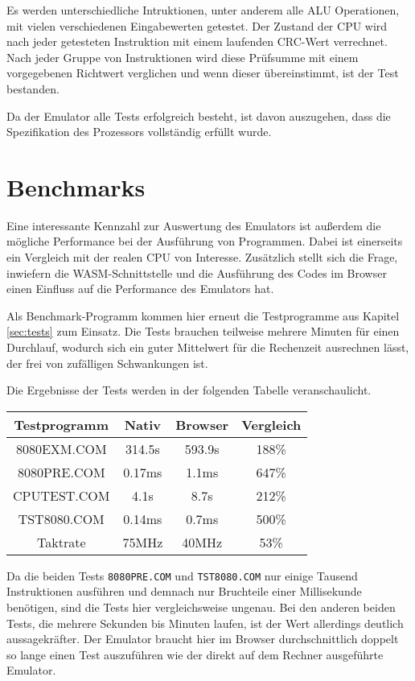 Es werden unterschiedliche Intruktionen, unter anderem alle \ac{ALU} Operationen, mit vielen verschiedenen Eingabewerten getestet. Der Zustand der \ac{CPU} wird nach jeder getesteten Instruktion mit einem laufenden \ac{CRC}-Wert verrechnet. Nach jeder Gruppe von Instruktionen wird diese Prüfsumme mit einem vorgegebenen Richtwert verglichen und wenn dieser übereinstimmt, ist der Test bestanden.

Da der Emulator alle Tests erfolgreich besteht, ist davon auszugehen, dass die Spezifikation des Prozessors vollständig erfüllt wurde.

\section{Benchmarks}

Eine interessante Kennzahl zur Auswertung des Emulators ist außerdem die mögliche Performance bei der Ausführung von Programmen. Dabei ist einerseits ein Vergleich mit der realen \ac{CPU} von Interesse. Zusätzlich stellt sich die Frage, inwiefern die \ac{WASM}-Schnittstelle und die Ausführung des Codes im Browser einen Einfluss auf die Performance des Emulators hat.

Als Benchmark-Programm kommen hier erneut die Testprogramme aus Kapitel \ref{sec:tests} zum Einsatz. Die Tests brauchen teilweise mehrere Minuten für einen Durchlauf, wodurch sich ein guter Mittelwert für die Rechenzeit ausrechnen lässt, der frei von zufälligen Schwankungen ist.

Die Ergebnisse der Tests werden in der folgenden Tabelle veranschaulicht.

\begin{center}
\begin{tabular}{ |c|c|c|c| } 
    \hline
    Testprogramm & Nativ & Browser & Vergleich \\
    \hline
    8080EXM.COM & 314.5s & 593.9s & 188\% \\
    8080PRE.COM & 0.17ms & 1.1ms & 647\% \\
    CPUTEST.COM & 4.1s & 8.7s & 212\% \\
    TST8080.COM & 0.14ms & 0.7ms & 500\% \\
    \hline
    Taktrate & 75MHz & 40MHz & 53\% \\
    \hline
\end{tabular}
\end{center}

Da die beiden Tests \texttt{8080PRE.COM} und \texttt{TST8080.COM} nur einige Tausend Instruktionen ausführen und demnach nur Bruchteile einer Millisekunde benötigen, sind die Tests hier vergleichsweise ungenau. Bei den anderen beiden Tests, die mehrere Sekunden bis Minuten laufen, ist der Wert allerdings deutlich aussagekräfter. Der Emulator braucht hier im Browser durchschnittlich doppelt so lange einen Test auszuführen wie der direkt auf dem Rechner ausgeführte Emulator.

